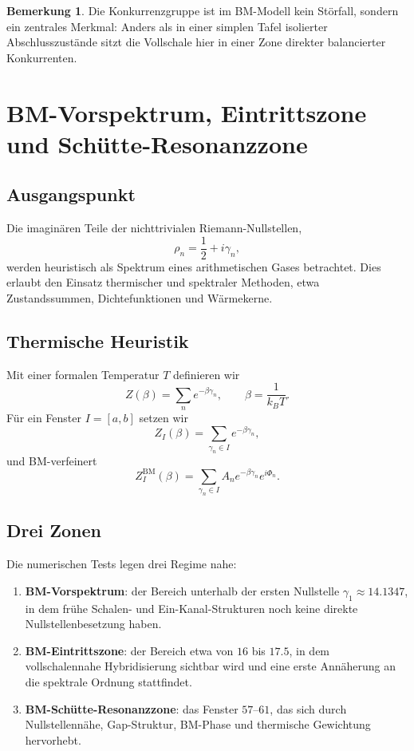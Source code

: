 \documentclass[11pt,a4paper]{article}
\theoremstyle{definition}
\newtheorem{bemerkung}[definition]{Bemerkung}
\theoremstyle{plain}
\begin{document}
	\begin{bemerkung}
		Die Konkurrenzgruppe ist im BM-Modell kein Störfall, sondern ein zentrales Merkmal: Anders als in einer simplen Tafel isolierter Abschlusszustände sitzt die Vollschale hier in einer Zone direkter balancierter Konkurrenten.
	\end{bemerkung}
	
	\section{BM-Vorspektrum, Eintrittszone und Schütte-Resonanzzone}
	
	\subsection{Ausgangspunkt}
	
	Die imaginären Teile der nichttrivialen Riemann-Nullstellen,
	\[
	\rho_n=\frac12+i\gamma_n,
	\]
	werden heuristisch als Spektrum eines arithmetischen Gases betrachtet. Dies erlaubt den Einsatz thermischer und spektraler Methoden, etwa Zustandssummen, Dichtefunktionen und Wärmekerne.
	
	\subsection{Thermische Heuristik}
	
	Mit einer formalen Temperatur $T$ definieren wir
	\[
	Z(\beta)=\sum_n e^{-\beta\gamma_n},
	\qquad \beta=\frac{1}{k_B T}.
	\]
	Für ein Fenster $I=[a,b]$ setzen wir
	\[
	Z_I(\beta)=\sum_{\gamma_n\in I} e^{-\beta\gamma_n},
	\]
	und BM-verfeinert
	\[
	Z_I^{\mathrm{BM}}(\beta)
	=
	\sum_{\gamma_n\in I} A_n e^{-\beta\gamma_n} e^{i\Phi_n}.
	\]
	
	\subsection{Drei Zonen}
	
	Die numerischen Tests legen drei Regime nahe:
	\begin{enumerate}[leftmargin=2em]
		\item \textbf{BM-Vorspektrum}: der Bereich unterhalb der ersten Nullstelle $\gamma_1\approx 14.1347$, in dem frühe Schalen- und Ein-Kanal-Strukturen noch keine direkte Nullstellenbesetzung haben.
		\item \textbf{BM-Eintrittszone}: der Bereich etwa von $16$ bis $17.5$, in dem vollschalennahe Hybridisierung sichtbar wird und eine erste Annäherung an die spektrale Ordnung stattfindet.
		\item \textbf{BM-Schütte-Resonanzzone}: das Fenster $57$--$61$, das sich durch Nullstellennähe, Gap-Struktur, BM-Phase und thermische Gewichtung hervorhebt.
	\end{enumerate}
	
\end{document}
